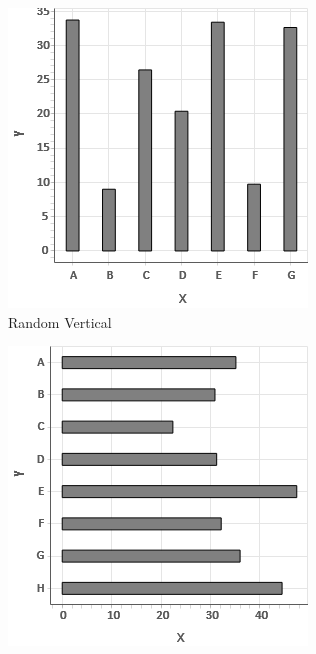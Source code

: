\begin{figure}
    \centering
    \begin{subfigure}[b]{0.24\textwidth}
        \centering
        \includegraphics[width=\textwidth]{figures/body/methodology/random_vertical_bar.png}
        \caption{Random Vertical}
        \label{figure:random_vertical_bar}
    \end{subfigure}
    \hfill
    \begin{subfigure}[b]{0.24\textwidth}
        \centering
        \includegraphics[width=\textwidth]{figures/body/methodology/random_horizontal_bar.png}

\end{subfigure}
\end{figure}
